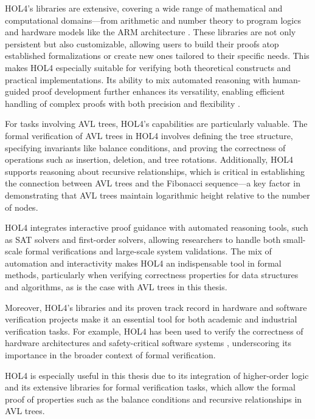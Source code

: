 \documentclass[12pt]{article}
\begin{document}
HOL4’s libraries are extensive, covering a wide range of mathematical and computational domains—from arithmetic and number theory to program logics and hardware models like the ARM architecture \cite{harrison2009handbook}. These libraries are not only persistent but also customizable, allowing users to build their proofs atop established formalizations or create new ones tailored to their specific needs. This makes HOL4 especially suitable for verifying both theoretical constructs and practical implementations. Its ability to mix automated reasoning with human-guided proof development further enhances its versatility, enabling efficient handling of complex proofs with both precision and flexibility \cite{nipkow2002isabelle}.

For tasks involving AVL trees, HOL4’s capabilities are particularly valuable. The formal verification of AVL trees in HOL4 involves defining the tree structure, specifying invariants like balance conditions, and proving the correctness of operations such as insertion, deletion, and tree rotations. Additionally, HOL4 supports reasoning about recursive relationships, which is critical in establishing the connection between AVL trees and the Fibonacci sequence—a key factor in demonstrating that AVL trees maintain logarithmic height relative to the number of nodes.

HOL4 integrates interactive proof guidance with automated reasoning tools, such as SAT solvers and first-order solvers, allowing researchers to handle both small-scale formal verifications and large-scale system validations. The mix of automation and interactivity makes HOL4 an indispensable tool in formal methods, particularly when verifying correctness properties for data structures and algorithms, as is the case with AVL trees in this thesis.

Moreover, HOL4's libraries and its proven track record in hardware and software verification projects make it an essential tool for both academic and industrial verification tasks. For example, HOL4 has been used to verify the correctness of hardware architectures and safety-critical software systems \cite{avigad2014formally}, underscoring its importance in the broader context of formal verification.

HOL4 is especially useful in this thesis due to its integration of higher-order logic and its extensive libraries for formal verification tasks, which allow the formal proof of properties such as the balance conditions and recursive relationships in AVL trees.
\end{document}
